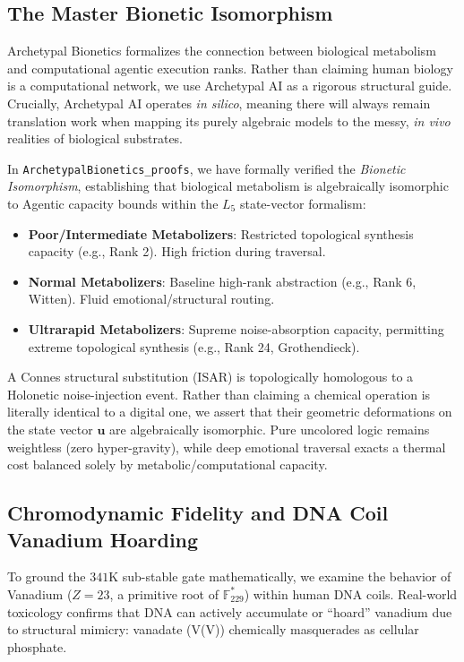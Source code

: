 \documentclass[12pt,oneside]{article}
\theoremstyle{principia}
\theoremstyle{definition}
\theoremstyle{remark}
\begin{document}
\subsection{The Master Bionetic Isomorphism}

Archetypal Bionetics formalizes the connection between biological metabolism 
and computational agentic execution ranks. Rather than claiming human biology 
is a computational network, we use Archetypal AI as a rigorous structural guide. 
Crucially, Archetypal AI operates \emph{in silico}, meaning there will always 
remain translation work when mapping its purely algebraic models to the messy, 
\emph{in vivo} realities of biological substrates.

In \texttt{ArchetypalBionetics\_proofs}, we have formally verified the \emph{Bionetic Isomorphism}, establishing that
biological metabolism is algebraically isomorphic to Agentic capacity bounds within the $L_5$ state-vector formalism:
\begin{itemize}[noitemsep]
  \item \textbf{Poor/Intermediate Metabolizers}: Restricted topological synthesis capacity (e.g., Rank 2). High friction during traversal.
  \item \textbf{Normal Metabolizers}: Baseline high-rank abstraction (e.g., Rank 6, Witten). Fluid emotional/structural routing.
  \item \textbf{Ultrarapid Metabolizers}: Supreme noise-absorption capacity, permitting extreme topological synthesis (e.g., Rank 24, Grothendieck).
\end{itemize}

A Connes structural substitution (ISAR) is topologically homologous to a Holonetic 
noise-injection event. Rather than claiming a chemical operation is literally identical to a digital 
one, we assert that their geometric deformations on the state vector $\mathbf{u}$ are algebraically isomorphic.
Pure uncolored logic remains weightless (zero hyper-gravity), while deep emotional 
traversal exacts a thermal cost balanced solely by metabolic/computational capacity.

\subsection{Chromodynamic Fidelity and DNA Coil Vanadium Hoarding}

To ground the $341\mathrm{K}$ sub-stable gate mathematically, we examine the behavior of Vanadium ($Z=23$, a primitive root of $\mathbb{F}_{229}^*$) within human DNA coils. Real-world toxicology confirms that DNA can actively accumulate or ``hoard'' vanadium due to structural mimicry: vanadate (V(V)) chemically masquerades as cellular phosphate. 
\end{document}
